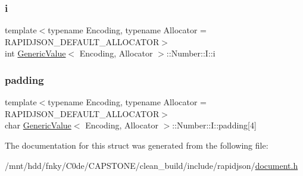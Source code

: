 \subsubsection{\texorpdfstring{i}{i}}
{\footnotesize\ttfamily template$<$typename Encoding, typename Allocator = R\+A\+P\+I\+D\+J\+S\+O\+N\+\_\+\+D\+E\+F\+A\+U\+L\+T\+\_\+\+A\+L\+L\+O\+C\+A\+T\+OR$>$ \\
int \hyperlink{classGenericValue}{Generic\+Value}$<$ Encoding, Allocator $>$\+::Number\+::\+I\+::i}

\mbox{\label{structGenericValue_1_1Number_1_1I_aefc064997f30c9c0b2bdce187d1d4cce}} 
\subsubsection{\texorpdfstring{padding}{padding}}
{\footnotesize\ttfamily template$<$typename Encoding, typename Allocator = R\+A\+P\+I\+D\+J\+S\+O\+N\+\_\+\+D\+E\+F\+A\+U\+L\+T\+\_\+\+A\+L\+L\+O\+C\+A\+T\+OR$>$ \\
char \hyperlink{classGenericValue}{Generic\+Value}$<$ Encoding, Allocator $>$\+::Number\+::\+I\+::padding\mbox{[}4\mbox{]}}



The documentation for this struct was generated from the following file\+:\begin{DoxyCompactItemize}
\item 
/mnt/hdd/fnky/\+C0de/\+C\+A\+P\+S\+T\+O\+N\+E/clean\+\_\+build/include/rapidjson/\hyperlink{document_8h}{document.\+h}\end{DoxyCompactItemize}
